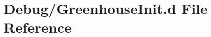 \hypertarget{_greenhouse_init_8d}{}\section{Debug/\+Greenhouse\+Init.d File Reference}
\label{_greenhouse_init_8d}
